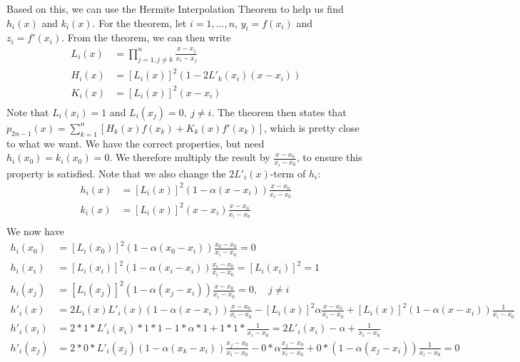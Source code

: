 Based on this, we can use the Hermite Interpolation Theorem to help us find $h_i(x)$ and $k_i(x)$. For the theorem, let $i = 1, ..., n$, $y_i = f(x_i)$ and $z_i = f'(x_i)$. From the theorem, we can then write
\begin{align*}
    L_i(x) &= \prod_{j = 1, j \ne k}^n \frac{x - x_j}{x_i - x_j} \\
    H_i(x) &= \left[ L_i(x) \right]^2 (1 - 2L'_k(x_i)(x - x_i)) \\
    K_i(x) &= \left[ L_i(x) \right]^2 (x - x_i) \\
\end{align*}
Note that $L_i(x_i) = 1$ and $L_i(x_j) = 0,\ j \ne i$. The theorem then states that $p_{2n-1}(x) = \sum_{k=1}^n \left[ H_k(x) f(x_k) + K_k(x) f'(x_k) \right]$, which is pretty close to what we want. We have the correct properties, but need $h_i(x_0) = k_i(x_0) = 0$. We therefore multiply the result by $\frac{x - x_0}{x_i - x_0}$, to ensure this property is satisfied. Note that we also change the $2L'_i(x)$-term of $h_i$:
\begin{align*}
    h_i(x) &= \left[ L_i(x) \right]^2 (1 - \alpha(x - x_i)) \frac{x - x_0}{x_i - x_0} \\
    k_i(x) &= \left[ L_i(x) \right]^2 (x - x_i) \frac{x - x_0}{x_i - x_0} \\
\end{align*}
We now have
\begin{align*}
    h_i(x_0) &= \left[ L_i(x_0) \right]^2 (1 - \alpha(x_0 - x_i)) \frac{x_0 - x_0}{x_i - x_0} = 0 \\
    h_i(x_i) &= \left[ L_i(x_i) \right]^2 (1 - \alpha(x_i - x_i)) \frac{x_i - x_0}{x_i - x_0} = \left[ L_i(x_i) \right]^2 = 1 \\
    h_i(x_j) &= \left[ L_i(x_j) \right]^2 (1 - \alpha(x_j - x_i)) \frac{x - x_0}{x_i - x_0} = 0, \quad j \ne i \\
    h'_i(x) &= 2 L_i(x) L'_i(x) (1 - \alpha(x - x_i)) \frac{x - x_0}{x_i - x_0} - \left[ L_i(x) \right]^2 \alpha \frac{x - x_0}{x_i - x_0} + \left[ L_i(x) \right]^2 (1 - \alpha(x - x_i)) \frac{1}{x_i - x_0} \\
    h'_i(x_i) &= 2 * 1 * L'_i(x_i) * 1  * 1 - 1 * \alpha * 1 + 1 * 1 * \frac{1}{x_i - x_0} = 2L'_i(x_i) - \alpha + \frac{1}{x_i - x_0} \\
    h'_i(x_j) &= 2 * 0 *  L'_i(x_j) (1 - \alpha(x_k - x_i)) \frac{x_j - x_0}{x_i - x_0} - 0 * \alpha \frac{x_j - x_0}{x_i - x_0} + 0 * (1 - \alpha(x_j - x_i)) \frac{1}{x_i - x_0} = 0 \\
\end{align*}

